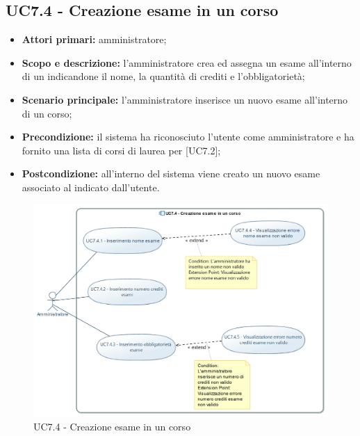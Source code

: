 \documentclass[AnalisiDeiRequisiti.tex]{subfiles}
\begin{document}
\subsection{UC7.4 - Creazione esame in un corso}
\begin{itemize}
	\item \textbf{Attori primari:} amministratore;
	\item \textbf{Scopo e descrizione:} l'amministratore crea ed assegna un esame all'interno di un  indicandone il nome, la quantità di crediti e l'obbligatorietà;
	\item \textbf{Scenario principale:} l'amministratore inserisce un nuovo esame all'interno di un corso;
	\item \textbf{Precondizione:} il sistema ha riconosciuto l'utente come amministratore e ha fornito una lista di corsi di laurea per  [UC7.2];
	\item \textbf{Postcondizione:} all'interno del sistema viene creato un nuovo esame associato al  indicato dall'utente.
\end{itemize}
\begin{figure}[H]
	\centering
	\includegraphics[width=1.0\linewidth]{UC7_4.jpg}
	\caption{UC7.4 - Creazione esame in un corso}
	\label{fig:UC7.4 - Creazione esame in un corso}
\end{figure}
\end{document}
